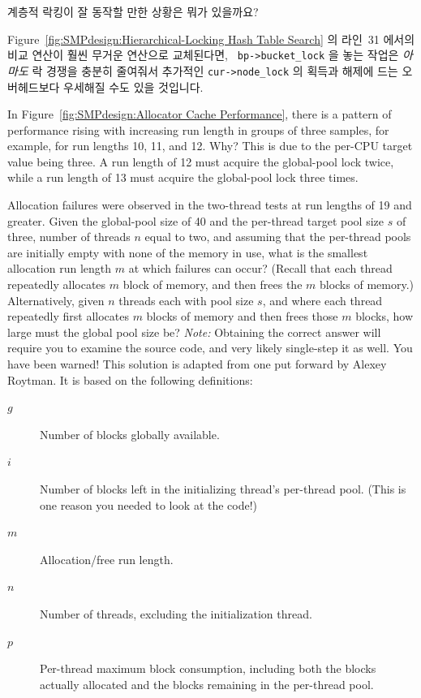 \begin{enumerate}
\QuickQ{}
	계층적 락킹이 잘 동작할 만한 상황은 뭐가 있을까요?

\QuickA{}
	Figure~\ref{fig:SMPdesign:Hierarchical-Locking Hash Table Search} 의
	라인~31 에서의 비교 연산이 훨씬 무거운 연산으로 교체된다면, {\tt
	bp->bucket\_lock} 을 놓는 작업은 \emph{아마도} 락 경쟁을 충분히
	줄여줘서 추가적인 {\tt cur->node\_lock} 의 획득과 해제에 드는
	오버헤드보다 우세해질 수도 있을 것입니다.

\QuickQ{}
	In Figure~\ref{fig:SMPdesign:Allocator Cache Performance},
	there is a pattern of performance rising with increasing run
	length in groups of three samples, for example, for run lengths
	10, 11, and 12.
	Why?
\QuickA{}
	This is due to the per-CPU target value being three.
	A run length of 12 must acquire the global-pool lock twice,
	while a run length of 13 must acquire the global-pool lock
	three times.

\QuickQ{}
	Allocation failures were observed in the two-thread
	tests at run lengths of 19 and greater.
	Given the global-pool size of 40 and the per-thread target
	pool size $s$ of three, number of threads $n$ equal to two,
	and assuming that the per-thread pools are initially
	empty with none of the memory in use, what is the smallest allocation
	run length $m$ at which failures can occur?
	(Recall that each thread repeatedly allocates $m$ block of memory,
	and then frees the $m$ blocks of memory.)
	Alternatively, given $n$ threads each with pool size $s$, and
	where each thread repeatedly first allocates $m$ blocks of memory
	and then frees those $m$ blocks, how large must the global pool
	size be?
	\emph{Note:} Obtaining the correct answer will require you to
	examine the  source code, and very likely
	single-step it as well.
	You have been warned!
\QuickA{}
	This solution is adapted from one put forward by Alexey Roytman.
	It is based on the following definitions:

	\begin{description}
	\item[$g$]	Number of blocks globally available.
	\item[$i$]	Number of blocks left in the initializing thread's
			per-thread pool.  (This is one reason you needed
			to look at the code!)
	\item[$m$]	Allocation/free run length.
	\item[$n$]	Number of threads, excluding the initialization thread.
	\item[$p$]	Per-thread maximum block consumption, including
			both the blocks actually allocated and the blocks
			remaining in the per-thread pool.
	\end{description}


\end{enumerate}
